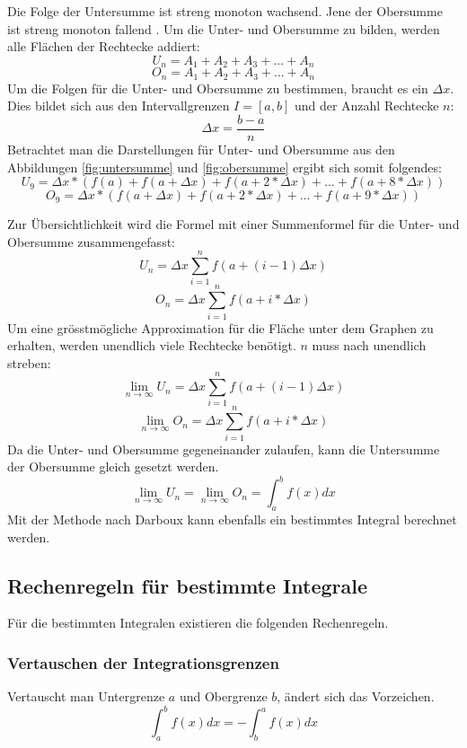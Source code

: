 \documentclass{fhnwreport} %
\begin{document}

Die Folge der Untersumme ist streng monoton wachsend. Jene der Obersumme ist streng monoton fallend \cite{Portmann2019}. Um die Unter- und Obersumme zu bilden, werden alle Flächen der Rechtecke addiert: 
\[
	U_n = A_1 +A_2+A_3+...+A_n
\]
\[
	O_n = A_1 +A_2+A_3+...+A_n
\]
Um die Folgen für die Unter- und Obersumme zu bestimmen, braucht es ein $\Delta x$. Dies bildet sich aus den Intervallgrenzen $I=[a,b]$ und der Anzahl Rechtecke $n$:
\[
	\Delta x = \frac{b -a }{n}
\]
Betrachtet man die Darstellungen für Unter- und Obersumme aus den Abbildungen \ref{fig:untersumme} und \ref{fig:obersumme} ergibt sich somit folgendes:
\[
	U_9 = \Delta x * (f(a) + f(a+ \Delta x) + f(a+ 2*\Delta x) + ... + f(a+ 8*\Delta x))
\]
\[
	O_9 = \Delta x * (f(a+ \Delta x) + f(a+ 2*\Delta x)+...+f(a+ 9*\Delta x))
\]

Zur Übersichtlichkeit wird die Formel mit einer Summenformel für die Unter- und Obersumme zusammengefasst:
\[	
	U_n = \Delta x \sum_{i=1}^{n} f(a +(i-1)\Delta x)
\]
\[
	O_n = \Delta x \sum_{i=1}^{n} f(a+i*\Delta x)
\]
Um eine grösstmögliche Approximation für die Fläche unter dem Graphen zu erhalten, werden unendlich viele Rechtecke benötigt. $n$ muss nach unendlich streben:
\[
	\lim_{n\rightarrow\infty} U_n = \Delta x \sum_{i=1}^{n} f(a +(i-1)\Delta x)
\]	
\[
	\lim_{n\rightarrow\infty} O_n = \Delta x \sum_{i=1}^{n} f(a+i*\Delta x)
\]
 Da die Unter- und Obersumme gegeneinander zulaufen, kann die Untersumme der Obersumme gleich gesetzt werden. 
\[
	\lim_{n\rightarrow\infty} U_n =\lim_{n\rightarrow\infty} O_n = \int_a^b f(x) dx
\]
Mit der Methode nach Darboux kann ebenfalls ein bestimmtes Integral berechnet werden.


\pagebreak
\subsection{Rechenregeln für bestimmte Integrale}
Für die bestimmten Integralen existieren die folgenden Rechenregeln.

\subsubsection{Vertauschen der Integrationsgrenzen}
Vertauscht man Untergrenze $a$ und Obergrenze $b$, ändert sich das Vorzeichen\cite{Portmann2019}.
\[
	\int_a^b f(x) dx = -\int_b^a f(x) dx
\]
\end{document}
